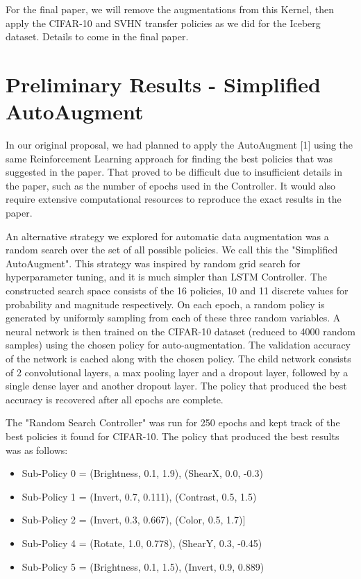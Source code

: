 \documentclass[10pt,twocolumn,letterpaper]{article}
\begin{document}
For the final paper, we will remove the augmentations from this Kernel, then apply the CIFAR-10 and SVHN transfer policies as we did for the Iceberg dataset.  Details to come in the final paper.

\section{Preliminary Results - Simplified AutoAugment}


In our original proposal, we had planned to apply the AutoAugment [1] using the same Reinforcement Learning approach for finding the best policies that was suggested in the paper.  That proved to be difficult due to insufficient details in the paper, such as the number of epochs used in the Controller.  It would also require extensive computational resources to reproduce the exact results in the paper.

An alternative strategy we explored for automatic data augmentation was a random search over the set of all possible policies. We call this the "Simplified AutoAugment".  This strategy was inspired by random grid search for hyperparameter tuning, and it is much simpler than LSTM Controller. The constructed search space consists of the 16 policies, 10 and 11 discrete values for probability and magnitude respectively. On each epoch, a random policy is generated by uniformly sampling from each of these three random variables. A neural network is then trained on the CIFAR-10 dataset (reduced to 4000 random samples) using the chosen policy for auto-augmentation. The validation accuracy of the network is cached along with the chosen policy. The child network consists of 2 convolutional layers, a max pooling layer and a dropout layer, followed by a single dense layer and another dropout layer. The policy that produced the best accuracy is recovered after all epochs are complete.

The "Random Search Controller" was run for 250 epochs and kept track of the best policies it found for CIFAR-10. The policy that produced the best results was as follows:

\begin{itemize}
  \item Sub-Policy 0 = (Brightness, 0.1, 1.9), (ShearX, 0.0, -0.3)
  \item Sub-Policy 1 = (Invert, 0.7, 0.111), (Contrast, 0.5, 1.5)
  \item Sub-Policy 2 = (Invert, 0.3, 0.667), (Color, 0.5, 1.7)]
  \item Sub-Policy 4 = (Rotate, 1.0, 0.778), (ShearY, 0.3, -0.45)
  \item Sub-Policy 5 = (Brightness, 0.1, 1.5), (Invert, 0.9, 0.889)
 
\end{itemize}
\end{document}
